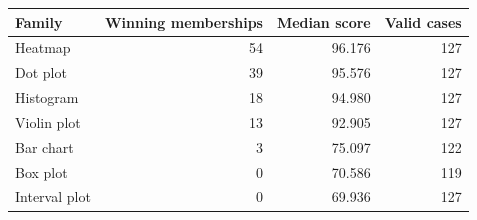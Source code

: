 \begin{tabular}{lrrr}\toprule
Family & Winning memberships & Median score & Valid cases\\\midrule
Heatmap & 54 & 96.176 & 127\\
Dot plot & 39 & 95.576 & 127\\
Histogram & 18 & 94.980 & 127\\
Violin plot & 13 & 92.905 & 127\\
Bar chart & 3 & 75.097 & 122\\
Box plot & 0 & 70.586 & 119\\
Interval plot & 0 & 69.936 & 127\\
\bottomrule\end{tabular}

